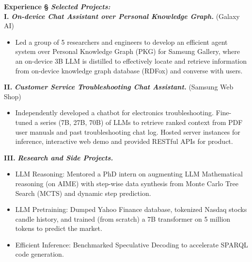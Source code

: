 \documentclass{resume} %
\begin{document}
\begin{rSection}{\Large \textbf{Experience}}
\vspace{-1mm}
\textbf{\S} \textsl{\textbf{Selected Projects:}} \\
\textbf{I.} \textsl{\bf On-device Chat Assistant over Personal Knowledge Graph.} (Galaxy AI)

\vspace{-1mm}
\begin{itemize}[noitemsep, topsep=-1pt, parsep=1pt, partopsep=0pt]
    \item Led a group of 5 researchers and engineers to develop an efficient agent system over Personal Knowledge Graph (PKG) for Samsung Gallery, where an on-device 3B LLM is distilled to effectively locate and retrieve information from on-device knowledge graph database (RDFox) and converse with users.   
\end{itemize}

\vspace{-1mm}
\textbf{II.} \textsl{\bf Customer Service Troubleshooting Chat Assistant.} (Samsung Web Shop)

\vspace{-1mm}
\begin{itemize}[noitemsep, topsep=-1pt, parsep=1pt, partopsep=0pt]
    \item Independently developed a chatbot for electronics troubleshooting. Fine-tuned a series (7B, 27B, 70B) of LLMs to retrieve ranked context from PDF user manuals and past troubleshooting chat log. Hosted server instances for inference, interactive web demo and provided RESTful APIs for product.
\end{itemize}

\vspace{-1mm}
\textbf{III.} \textsl{\bf Research and Side Projects. }
\vspace{-1mm}
\begin{itemize}[noitemsep, topsep=-1pt, parsep=1pt, partopsep=0pt]
    \item LLM Reasoning: Mentored a PhD intern on augmenting LLM Mathematical reasoning (on AIME) with step-wise data synthesis from Monte Carlo Tree Search (MCTS) and dynamic step prediction.
    \item LLM Pretraining: Dumped Yahoo Finance database, tokenized Nasdaq stocks candle history, and trained (from scratch) a 7B transformer on 5 million tokens to predict the market.
    \item Efficient Inference: Benchmarked Speculative Decoding to accelerate SPARQL code generation.
\end{itemize}


\end{rSection}
\end{document}

